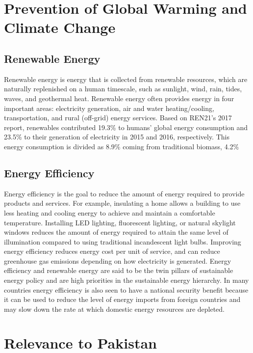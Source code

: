 \documentclass{article}
\begin{document}
\section{Prevention of Global Warming and Climate Change}
\subsection{Renewable Energy}
Renewable energy is energy that is collected from renewable resources, which
are naturally replenished on a human timescale, such as sunlight, wind, rain,
tides, waves, and geothermal heat. Renewable energy often provides energy in
four important areas: electricity generation, air and water heating/cooling,
transportation, and rural (off-grid) energy services. Based on REN21's 2017
report, renewables contributed 19.3\% to humans' global energy consumption and
23.5\% to their generation of electricity in 2015 and 2016, respectively. This
energy consumption is divided as 8.9\% coming from traditional biomass, 4.2\%

\subsection{Energy Efficiency}
Energy efficiency is the goal to reduce the amount of energy required to
provide products and services. For example, insulating a home allows a building
to use less heating and cooling energy to achieve and maintain a comfortable
temperature. Installing LED lighting, fluorescent lighting, or natural skylight
windows reduces the amount of energy required to attain the same level of
illumination compared to using traditional incandescent light bulbs. Improving
energy efficiency reduces energy cost per unit of service, and can reduce
greenhouse gas emissions depending on how electricity is generated. Energy
efficiency and renewable energy are said to be the twin pillars of sustainable
energy policy and are high priorities in the sustainable energy hierarchy. In
many countries energy efficiency is also seen to have a national security
benefit because it can be used to reduce the level of energy imports from
foreign countries and may slow down the rate at which domestic energy resources
are depleted.

\section{Relevance to Pakistan}
\end{document}
